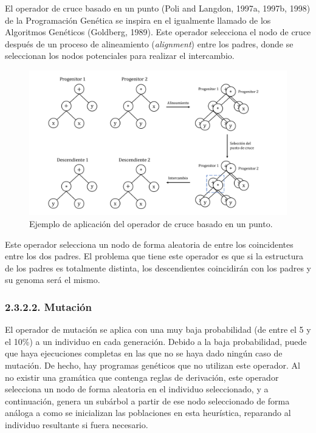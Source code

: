 \documentclass[spanish,a4paper,12pt,twoside]{report}
\begin{document}
        \subsubsection*{\vspace{-0.5cm}{\normalsize Operador basado en un punto}}
        \vspace{-0.5cm}
        El operador de cruce basado en un punto (Poli and Langdon, 1997a, 1997b, 1998) de la Programación Genética se inspira en el igualmente llamado de los Algoritmos Genéticos (Goldberg, 1989). Este operador selecciona el nodo de cruce después de un proceso de alineamiento (\emph{alignment}) entre los padres, donde se seleccionan los nodos potenciales para realizar el intercambio.
        \begin{figure}[H]
          \centering
          \includegraphics[width = 1\textwidth]{resources/Fig4.pdf}
          \caption{Ejemplo de aplicación del operador de cruce basado en un punto.}
          \label{fig:4}
        \end{figure} \par
        Este operador selecciona un nodo de forma aleatoria de entre los coincidentes entre los dos padres. El problema que tiene este operador es que si la estructura de los padres es totalmente distinta, los descendientes coincidirán con los padres y su genoma será el mismo.
        
      \subsubsection*{\normalsize 2.3.2.2. Mutación}
      El operador de mutación se aplica con una muy baja probabilidad (de entre el 5 y el 10\%) a un individuo en cada generación. Debido a la baja probabilidad, puede que haya ejecuciones completas en las que no se haya dado ningún caso de mutación. De hecho, hay programas genéticos que no utilizan este operador. Al no existir una gramática que contenga reglas de derivación, este operador selecciona un nodo de forma aleatoria en el individuo seleccionado, y a continuación, genera un subárbol a partir de ese nodo seleccionado de forma análoga a como se inicializan las poblaciones en esta heurística, reparando al individuo resultante si fuera necesario.
  
\end{document}
